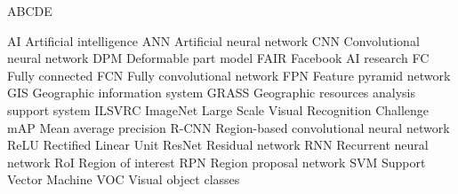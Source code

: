 
\begin{seznamzkratek}{ABCDE}

	      {AI}
	      {Artificial intelligence}
	      {ANN}
	      {Artificial neural network}
	      {CNN}
	      {Convolutional neural network}
	      {DPM}
	      {Deformable part model}
	      {FAIR}
	      {Facebook AI research}
	      {FC}
	      {Fully connected}
	      {FCN}
	      {Fully convolutional network}
	      {FPN}
	      {Feature pyramid network}
	      {GIS}
	      {Geographic information system}
	      {GRASS}
	      {Geographic resources analysis support system}
	      {ILSVRC}
	      {ImageNet Large Scale Visual Recognition Challenge}
	      {mAP}
	      {Mean average precision}
	      {R-CNN}
	      {Region-based convolutional neural network}
	      {ReLU}
	      {Rectified Linear Unit}
	      {ResNet}
	      {Residual network}
	      {RNN}
	      {Recurrent neural network}
	      {RoI}
	      {Region of interest}
	      {RPN}
	      {Region proposal network}
	      {SVM}
	      {Support Vector Machine}
	      {VOC}
	      {Visual object classes}
	      
\end{seznamzkratek}
